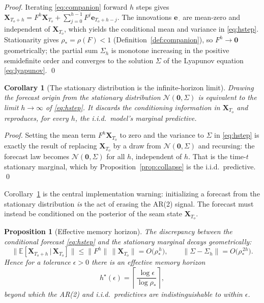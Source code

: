 \documentclass[11pt]{article}
\newtheorem{proposition}{Proposition}
\newtheorem{corollary}{Corollary}
\theoremstyle{definition}
\theoremstyle{remark}
\newcommand{\E}{\mathbb{E}}
\newcommand{\Norm}{\mathcal{N}}
\newcommand{\given}{\,\vert\,}
\newcommand{\spradius}{\rho_{\!*}}
\begin{document}
\begin{proof}
Iterating \eqref{eq:companion} forward $h$ steps gives
$\bm X_{T_o+h} = F^h \bm X_{T_o}
  + \sum_{j=0}^{h-1} F^j \bm e_{T_o+h-j}$.
The innovations $\bm e_{\,\cdot}$ are mean-zero and independent of
$\bm X_{T_o}$, which yields the conditional mean and variance in
\eqref{eq:hstep}. Stationarity gives $\spradius = \rho(F) < 1$
(Definition~\ref{def:companion}), so $F^h \to \bm 0$ geometrically;
the partial sum $\Sigma_h$ is monotone increasing in the positive
semidefinite order and converges to the solution $\Sigma$ of the
Lyapunov equation \eqref{eq:lyapunov}. \qed
\end{proof}

\begin{corollary}[The stationary distribution is the infinite-horizon limit]
\label{cor:stationary-limit}
Drawing the forecast origin from the stationary distribution
$\Norm(\bm 0,\Sigma)$ is equivalent to the limit $h\to\infty$ of
\eqref{eq:hstep}. It discards the conditioning information in
$\bm X_{T_o}$ and reproduces, for every $h$, the i.i.d.\ model's
marginal predictive.
\end{corollary}

\begin{proof}
Setting the mean term $F^h\bm X_{T_o}$ to zero and the variance to
$\Sigma$ in \eqref{eq:hstep} is exactly the result of replacing
$\bm X_{T_o}$ by a draw from $\Norm(\bm 0,\Sigma)$ and recursing: the
forecast law becomes $\Norm(\bm 0,\Sigma)$ for all $h$, independent of
$h$. That is the time-$t$ stationary marginal, which by
Proposition~\ref{prop:collapse} is the i.i.d.\ predictive. \qed
\end{proof}

Corollary~\ref{cor:stationary-limit} is the central implementation
warning: initializing a forecast from the stationary distribution
\emph{is} the act of erasing the AR(2) signal. The forecast must
instead be conditioned on the posterior of the seam state $\bm X_{T_o}$.

\begin{proposition}[Effective memory horizon]
\label{prop:horizon}
The discrepancy between the conditional forecast \eqref{eq:hstep} and
the stationary marginal decays geometrically:
\begin{equation}
  \big\| \E[\bm X_{T_o+h}\given \bm X_{T_o}] \big\|
    \le \|F^h\|\,\|\bm X_{T_o}\|
    = O\!\big(\spradius^{\,h}\big),
  \qquad
  \|\Sigma - \Sigma_h\| = O\!\big(\spradius^{\,2h}\big).
  \label{eq:decay}
\end{equation}
Hence for a tolerance $\epsilon>0$ there is an effective memory horizon
\begin{equation}
  h^\star(\epsilon)
  = \left\lceil \frac{\log\epsilon}{\log\spradius} \right\rceil,
  \label{eq:hstar}
\end{equation}
beyond which the AR(2) and i.i.d.\ predictives are indistinguishable to
within $\epsilon$.
\end{proposition}
\end{document}
